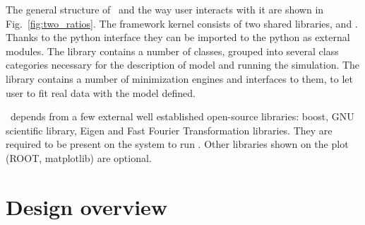 The general structure of \BornAgain\ and the way user interacts with it are
shown in Fig.~\ref{fig:two_ratios}.
The framework kernel consists of two shared libraries,  and
. Thanks to the python interface they can be imported to the python as external modules. The library  contains a number of classes, grouped into several class categories necessary for the description of model and running the simulation.
The library   contains a number of minimization engines 
and interfaces to them, to let user to fit real data with the model defined.

\BornAgain\ depends from a few external well established open-source libraries: boost, GNU scientific library, Eigen and Fast Fourier Transformation libraries. They are required to be present on the system to run \BornAgain . Other libraries shown
on the plot (ROOT, matplotlib) are optional.

 



\section{Design overview}





